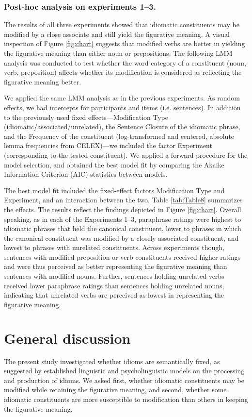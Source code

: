 \subsubsection{Post-hoc analysis on experiments 1--3.}    

The results of all three experiments showed that idiomatic constituents may be modified by a close associate and still yield the figurative meaning. A visual inspection of Figure \ref{fig:chart} suggests that modified verbs are better in yielding the figurative meaning than either noun or prepositions. The following LMM analysis was conducted to test whether the word category of a constituent (noun, verb, preposition) affects whether its modification is considered as reflecting the figurative meaning better. 

We applied the same LMM analysis as in the previous experiments. As random effects, we had intercepts for participants and items (i.e. sentences). In addition to the previously used fixed effects—Modification Type (idiomatic/associated/unrelated), the Sentence Closure of the idiomatic phrase, and the Frequency of the constituent (log-transformed and centered, absolute lemma frequencies from CELEX)—we included the factor Experiment (corresponding to the tested constituent).  We applied a forward procedure for the model selection, and obtained the best model fit by comparing the Akaike Information Criterion (AIC) statistics between models. 

The best model fit included the fixed-effect factors Modification Type and Experiment, and an interaction between the two.  Table \ref{tab:Table8} summarizes the effects. The results reflect the findings depicted in Figure \ref{fig:chart}.  Overall speaking, as in each of the Experiments 1--3, paraphrase ratings were highest to idiomatic phrases that held the canonical constituent, lower to phrases in which the canonical constituent was modified by a closely associated constituent, and lowest to phrases with unrelated constituents. Across experiments though, sentences with modified preposition or verb constituents received higher ratings and were thus perceived as better representing the figurative meaning than sentences with modified nouns. Further, sentences holding unrelated verbs received lower paraphrase ratings than sentences holding unrelated nouns, indicating that unrelated verbs are perceived as lowest in representing the figurative meaning. 

\section{General discussion}
The present study investigated whether idioms are semantically fixed, as suggested by established linguistic and psycholinguistic models on the processing and production of idioms. We asked first, whether idiomatic constituents may be modified while retaining the figurative meaning, and second, whether some idiomatic constituents are more susceptible to modification than others in keeping the figurative meaning. 

